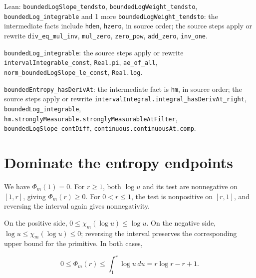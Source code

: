 \documentclass[11pt,a4paper]{article}
\begin{document}
\begin{leanbox}{Lean: \texttt{boundedLogSlope\_\allowbreak{}tendsto}, \texttt{boundedLogWeight\_\allowbreak{}tendsto}, \texttt{boundedLog\_\allowbreak{}integrable} and 1 more}
\texttt{bounded\allowbreak{}Log\allowbreak{}Weight\_\allowbreak{}tendsto}: the intermediate facts include \texttt{hden}, \texttt{hzero}, in source order; the source steps apply or rewrite \texttt{div\_\allowbreak{}eq\_\allowbreak{}mul\_\allowbreak{}inv}, \texttt{mul\_\allowbreak{}zero}, \texttt{zero\_\allowbreak{}pow}, \texttt{add\_\allowbreak{}zero}, \texttt{inv\_\allowbreak{}one}.



\texttt{bounded\allowbreak{}Log\_\allowbreak{}integrable}: the source steps apply or rewrite \texttt{interval\allowbreak{}Integrable\_\allowbreak{}const}, \texttt{Real.\allowbreak{}pi}, \texttt{ae\_\allowbreak{}of\_\allowbreak{}all}, \texttt{norm\_\allowbreak{}bounded\allowbreak{}Log\allowbreak{}Slope\_\allowbreak{}le\_\allowbreak{}const}, \texttt{Real.\allowbreak{}log}.



\texttt{bounded\allowbreak{}Entropy\_\allowbreak{}has\allowbreak{}Deriv\allowbreak{}At}: the intermediate fact is \texttt{hm}, in source order; the source steps apply or rewrite \texttt{interval\allowbreak{}Integral.\allowbreak{}integral\_\allowbreak{}has\allowbreak{}Deriv\allowbreak{}At\_\allowbreak{}right}, \texttt{bounded\allowbreak{}Log\_\allowbreak{}integrable}, \texttt{hm.\allowbreak{}strongly\allowbreak{}Measurable.\allowbreak{}strongly\allowbreak{}Measurable\allowbreak{}At\allowbreak{}Filter}, \texttt{bounded\allowbreak{}Log\allowbreak{}Slope\_\allowbreak{}cont\allowbreak{}Diff}, \texttt{continuous.\allowbreak{}continuous\allowbreak{}At.\allowbreak{}comp}.
\end{leanbox}

\section{\texorpdfstring{Dominate the entropy endpoints}{Dominate the entropy endpoints}}


We have \(\Phi_m(1)=0\). For \(r\ge1\), both \(\log u\) and its test are nonnegative on \([1,r]\), giving \(\Phi_m(r)\ge0\). For \(0<r\le1\), the test is nonpositive on \([r,1]\), and reversing the interval again gives nonnegativity.



On the positive side, \(0\le\chi_m(\log u)\le\log u\). On the negative side, \(\log u\le\chi_m(\log u)\le0\); reversing the interval preserves the corresponding upper bound for the primitive. In both cases,

\[0\le\Phi_m(r)\le\int_1^r\log u\,du=r\log r-r+1.\]
\end{document}
